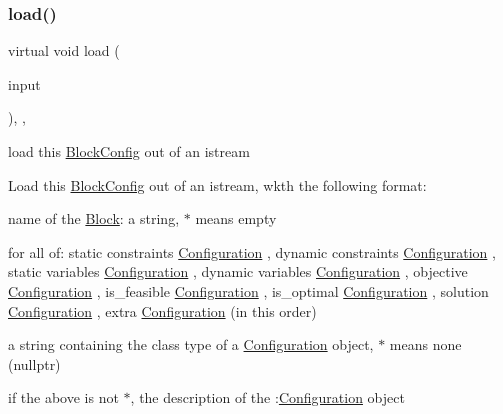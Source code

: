 \subsubsection{\texorpdfstring{load()}{load()}}
{\footnotesize\ttfamily virtual void load (\begin{DoxyParamCaption}\item[{std\+::istream \&}]{input }\end{DoxyParamCaption})\hspace{0.3cm}{\ttfamily [override]}, {\ttfamily [protected]}, {\ttfamily [virtual]}}



load this \mbox{\hyperlink{class_s_m_spp__di__unipi__it_1_1_block_config}{Block\+Config}} out of an istream 

Load this \mbox{\hyperlink{class_s_m_spp__di__unipi__it_1_1_block_config}{Block\+Config}} out of an istream, wkth the following format\+:

name of the \mbox{\hyperlink{class_s_m_spp__di__unipi__it_1_1_block}{Block}}\+: a string, \textquotesingle{}$\ast$\textquotesingle{} means empty

for all of\+: static constraints \mbox{\hyperlink{class_s_m_spp__di__unipi__it_1_1_configuration}{Configuration}} , dynamic constraints \mbox{\hyperlink{class_s_m_spp__di__unipi__it_1_1_configuration}{Configuration}} , static variables \mbox{\hyperlink{class_s_m_spp__di__unipi__it_1_1_configuration}{Configuration}} , dynamic variables \mbox{\hyperlink{class_s_m_spp__di__unipi__it_1_1_configuration}{Configuration}} , objective \mbox{\hyperlink{class_s_m_spp__di__unipi__it_1_1_configuration}{Configuration}} , is\+\_\+feasible \mbox{\hyperlink{class_s_m_spp__di__unipi__it_1_1_configuration}{Configuration}} , is\+\_\+optimal \mbox{\hyperlink{class_s_m_spp__di__unipi__it_1_1_configuration}{Configuration}} , solution \mbox{\hyperlink{class_s_m_spp__di__unipi__it_1_1_configuration}{Configuration}} , extra \mbox{\hyperlink{class_s_m_spp__di__unipi__it_1_1_configuration}{Configuration}} (in this order)


\begin{DoxyItemize}
\item a string containing the class type of a \mbox{\hyperlink{class_s_m_spp__di__unipi__it_1_1_configuration}{Configuration}} object, \textquotesingle{}$\ast$\textquotesingle{} means none (nullptr)
\end{DoxyItemize}

if the above is not \textquotesingle{}$\ast$\textquotesingle{}, the description of the \+:\mbox{\hyperlink{class_s_m_spp__di__unipi__it_1_1_configuration}{Configuration}} object

